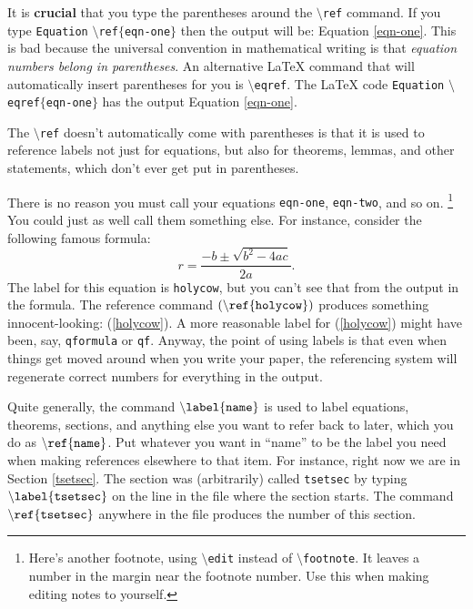 \documentclass[12pt,letterpaper]{amsart}
\newcommand{\sm}{\setminus}
\newcommand{\pln}[1]{$\sm${\tt #1}}
\newcommand{\marginalfootnote}[1]{%
        \footnote{#1}
        \marginpar[\hfill{\sf\thefootnote}]{{\sf\thefootnote}}}
\newcommand{\edit}[1]{\marginalfootnote{#1}}
\theoremstyle{plain}
\theoremstyle{definition}
\numberwithin{equation}{section}
\begin{document}
It is {\bf crucial} that you type the parentheses around the 
\pln{ref} command.  If you type {\tt Equation} \pln{ref}$\{${\tt eqn-one}$\}$ then the output will be: Equation \ref{eqn-one}. 
This is bad because the universal convention in mathematical writing is that {\it equation numbers belong in parentheses}.
An alternative LaTeX command that will automatically insert parentheses for you is \pln{eqref}. The LaTeX code 
{\tt Equation} \pln{eqref}$\{${\tt eqn-one}$\}$ has the output Equation \eqref{eqn-one}.  

The \pln{ref} doesn't automatically come with parentheses is that it is used to reference labels not just for equations, but also for theorems, lemmas, and other statements, which don't ever get put in parentheses.

There is no reason you must call your equations {\tt eqn-one}, {\tt eqn-two}, 
and so on.\edit{Here's another footnote, using 
\pln{edit} instead of \pln{footnote}. It leaves a number 
in the margin near the footnote number.  Use this when making editing notes to yourself.}
You could just as well call them something else.  For instance, 
consider the following famous formula:
\begin{equation}\label{holycow} 
r = \frac{-b \pm \sqrt{b^2-4ac}}{2a}.
\end{equation}
The label for this equation is 
{\tt holycow}, but you can't see that from 
the output in the formula. 
The reference command 
$\tt ({\sm}ref\{holycow\})$ 
produces something innocent-looking: (\ref{holycow}). 
A more reasonable label for 
(\ref{holycow}) might have been, say, {\tt qformula} or {\tt qf}.
Anyway, the point of using labels is that even when things get moved around when you write your paper, the  referencing system will regenerate 
correct numbers for everything in the output.

Quite generally, the command $\tt {\sm}label\{name\}$ is used to 
label equations, theorems, sections, and anything else you 
want to refer back to later, which you do as $\tt {\sm}ref\{name\}$.
Put whatever you want in ``name'' to be the label you need 
when making references elsewhere to that item.
For instance, right now we are in Section \ref{tsetsec}. 
The section was (arbitrarily) called {\tt tsetsec} by 
typing $\tt {\sm}label\{tsetsec\}$ on the line in the file where 
the section starts. 
The command $\tt {\sm}ref\{tsetsec\}$ anywhere in the file 
produces the number of this section.
\end{document}
